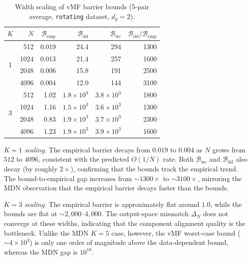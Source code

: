 \documentclass[11pt]{article}
\newcommand{\cB}{\mathcal{B}}
\begin{document}
\begin{table}[H]
\centering
\small
\renewcommand{\arraystretch}{1.15}
\caption{Width scaling of vMF barrier bounds (5-pair average,
  \texttt{rotating} dataset, $d_y = 2$).}
\label{tab:vmf_bound_scaling}
\begin{tabular}{c|r|rrrr}
$K$ & $N$ & $\cB_{\mathrm{emp}}$ & $\cB_{\mathrm{dd}}$
  & $\cB_{\mathrm{wc}}$
  & $\cB_{\mathrm{dd}}/\cB_{\mathrm{emp}}$ \\
\hline
\multirow{4}{*}{1}
  & 512   & 0.019 & 24.4 & 294
    & 1300 \\
  & 1024  & 0.013 & 21.4 & 257
    & 1600 \\
  & 2048  & 0.006 & 15.8 & 191
    & 2500 \\
  & 4096  & 0.004 & 12.0 & 144
    & 3100 \\
\hline
\multirow{4}{*}{3}
  & 512   & 1.02  & $1.8 \times 10^{3}$ & $3.8 \times 10^{3}$
    & 1800 \\
  & 1024  & 1.16  & $1.5 \times 10^{3}$ & $3.6 \times 10^{3}$
    & 1300 \\
  & 2048  & 0.83  & $1.9 \times 10^{3}$ & $3.7 \times 10^{3}$
    & 2300 \\
  & 4096  & 1.23  & $1.9 \times 10^{3}$ & $3.9 \times 10^{3}$
    & 1600 \\
\end{tabular}
\end{table}

\emph{$K=1$ scaling.}
The empirical barrier decays from $0.019$ to $0.004$
as $N$ grows from $512$ to $4096$, consistent with the predicted
$O(1/N)$ rate.
Both $\cB_{\mathrm{wc}}$ and $\cB_{\mathrm{dd}}$ also decay
(by roughly $2\times$), confirming that the bounds track the empirical
trend.
The bound-to-empirical gap increases from $\sim\!1300\times$ to
$\sim\!3100\times$, mirroring the MDN observation that the empirical
barrier decays faster than the bounds.

\emph{$K=3$ scaling.}
The empirical barrier is approximately flat around $1.0$,
while the bounds are flat at $\sim\!2{,}000$--$4{,}000$.
The output-space mismatch $\Delta_N$ does not converge at these
widths, indicating that the component alignment quality is the
bottleneck.
Unlike the MDN $K=5$ case, however, the vMF worst-case bound
($\sim\!4 \times 10^3$) is only one order of magnitude above the
data-dependent bound, whereas the MDN gap is $10^{18}$.

\end{document}
